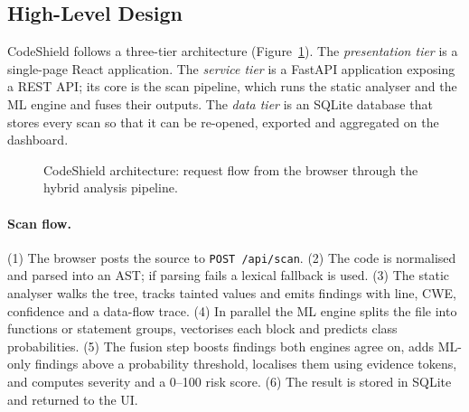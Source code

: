 \documentclass[11pt,a4paper,twoside]{report}
\begin{document}
\subsection{High-Level Design}
CodeShield follows a three-tier architecture (Figure~\ref{fig:arch}). The \emph{presentation tier} is a single-page React application. The \emph{service tier} is a FastAPI application exposing a REST API; its core is the scan pipeline, which runs the static analyser and the ML engine and fuses their outputs. The \emph{data tier} is an SQLite database that stores every scan so that it can be re-opened, exported and aggregated on the dashboard.

\begin{figure}[H]
\centering
{}
\caption{CodeShield architecture: request flow from the browser through the hybrid analysis pipeline.}
\label{fig:arch}
\end{figure}

\paragraph{Scan flow.} (1) The browser posts the source to \texttt{POST /api/scan}. (2) The code is normalised and parsed into an AST; if parsing fails a lexical fallback is used. (3) The static analyser walks the tree, tracks tainted values and emits findings with line, CWE, confidence and a data-flow trace. (4) In parallel the ML engine splits the file into functions or statement groups, vectorises each block and predicts class probabilities. (5) The fusion step boosts findings both engines agree on, adds ML-only findings above a probability threshold, localises them using evidence tokens, and computes severity and a 0--100 risk score. (6) The result is stored in SQLite and returned to the UI.
\end{document}
